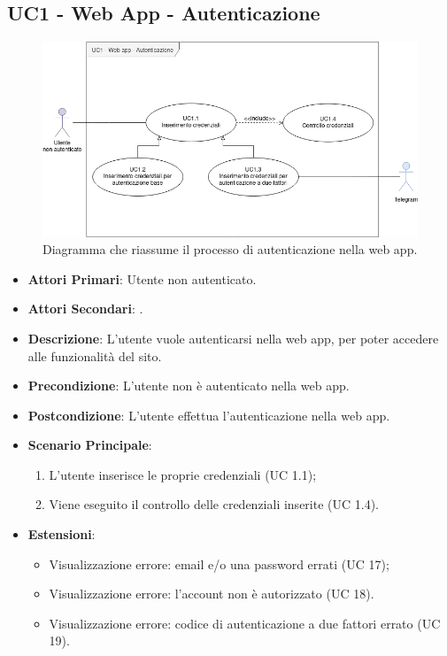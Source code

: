 	\subsection{UC1 - Web App - Autenticazione}
		
	\begin{figure}[H]
		\centering
		\includegraphics[scale=0.60]{res/images/uc1}
		\caption{Diagramma che riassume il processo di autenticazione nella web app.}
	\end{figure}
		
	\begin{itemize}
		\item \textbf{Attori Primari}: Utente non autenticato.
		\item \textbf{Attori Secondari}: .
		\item \textbf{Descrizione}: L'utente vuole autenticarsi nella web app, per poter accedere alle funzionalità del sito.
		\item \textbf{Precondizione}: L'utente non è autenticato nella web app.
		\item \textbf{Postcondizione}: L'utente effettua l'autenticazione nella web app.
		\item \textbf{Scenario Principale}:
		\begin{enumerate}
			\item L'utente inserisce le proprie credenziali (UC 1.1);
			\item Viene eseguito il controllo delle credenziali inserite (UC 1.4).
		\end{enumerate}
		\item \textbf{Estensioni}:
			\begin{itemize}
				\item Visualizzazione errore: email e/o una password errati (UC 17);
				\item Visualizzazione errore: l'account non è autorizzato (UC 18).
				\item Visualizzazione errore: codice di autenticazione a due fattori errato (UC 19).
			\end{itemize}
	\end{itemize}
	

